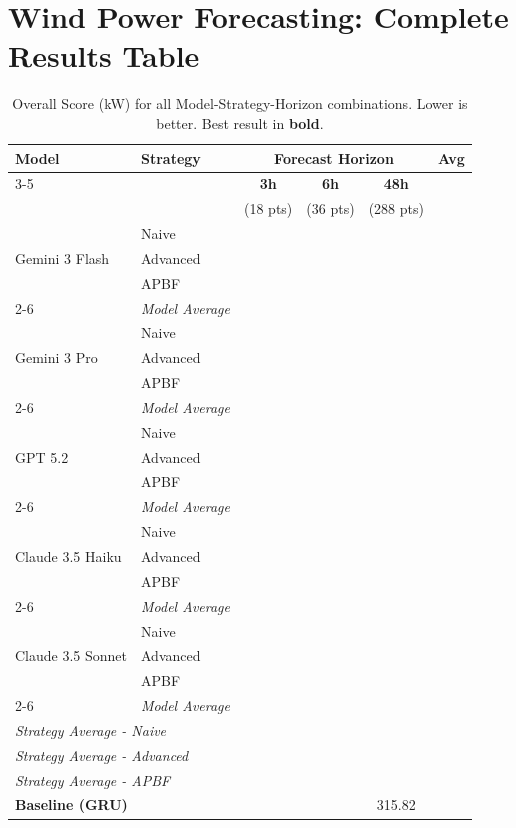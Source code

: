\documentclass{article}
\begin{document}
\section*{Wind Power Forecasting: Complete Results Table}

\begin{table}[h!]
\centering
\caption{Overall Score (kW) for all Model-Strategy-Horizon combinations. Lower is better. Best result in \textbf{bold}.}
\label{tab:complete_results}
\begin{tabular}{llcccc}
\toprule
\multirow{2}{*}{\textbf{Model}} & \multirow{2}{*}{\textbf{Strategy}} & \multicolumn{3}{c}{\textbf{Forecast Horizon}} & \multirow{2}{*}{\textbf{Avg}} \\
\cmidrule{3-5}
& & \textbf{3h} & \textbf{6h} & \textbf{48h} & \\
& & (18 pts) & (36 pts) & (288 pts) & \\
\midrule
\multirow{3}{*}{Gemini 3 Flash}
& Naive    & & & & \\
& Advanced & & & & \\
& APBF     & & & & \\
\cmidrule{2-6}
& \textit{Model Average} & & & & \\
\midrule
\multirow{3}{*}{Gemini 3 Pro}
& Naive    & & & & \\
& Advanced & & & & \\
& APBF     & & & & \\
\cmidrule{2-6}
& \textit{Model Average} & & & & \\
\midrule
\multirow{3}{*}{GPT 5.2}
& Naive    & & & & \\
& Advanced & & & & \\
& APBF     & & & & \\
\cmidrule{2-6}
& \textit{Model Average} & & & & \\
\midrule
\multirow{3}{*}{Claude 3.5 Haiku}
& Naive    & & & & \\
& Advanced & & & & \\
& APBF     & & & & \\
\cmidrule{2-6}
& \textit{Model Average} & & & & \\
\midrule
\multirow{3}{*}{Claude 3.5 Sonnet}
& Naive    & & & & \\
& Advanced & & & & \\
& APBF     & & & & \\
\cmidrule{2-6}
& \textit{Model Average} & & & & \\
\midrule
\midrule
\multicolumn{2}{l}{\textit{Strategy Average - Naive}} & & & & \\
\multicolumn{2}{l}{\textit{Strategy Average - Advanced}} & & & & \\
\multicolumn{2}{l}{\textit{Strategy Average - APBF}} & & & & \\
\midrule
\multicolumn{2}{l}{\textbf{Baseline (GRU)}} & & & 315.82 & \\
\bottomrule
\end{tabular}
\end{table}
\end{document}

